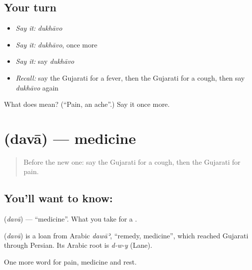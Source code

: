 \subsection*{Your turn}
\begin{itemize}
\raggedright
  \item \emph{Say it:} \emph{dukhāvo}
  \item \emph{Say it:} \emph{dukhāvo}, once more
  \item \emph{Say it:} say \emph{dukhāvo}
  \item \emph{Recall:} say the Gujarati for a fever, then the Gujarati for a cough, then say \emph{dukhāvo} again
\end{itemize}

\begin{tcolorbox}[breakable,colback=teal!4,colframe=teal!35!black,title={Before you move on}]
What does  mean? (\textquotedblleft{}Pain, an ache\textquotedblright{}.) Say it once more.
\end{tcolorbox}
\section[\texorpdfstring{\gu{દવા} (davā)}{દવા (davā)}]{ (davā) — medicine}

\label{lesson:GU-C49-medicine}



\begin{quote}
Before the new one: say the Gujarati for a cough, then the Gujarati for pain.
\end{quote}

\subsection*{You'll want to know: }
\textbf{} (\emph{davā}) — \textquotedblleft{}medicine\textquotedblright{}. What you take for a \textbf{}.

\begin{cousinweb}
\textbf{} (\emph{davā}) is a loan from Arabic \emph{dawāʾ}, \textquotedblleft{}remedy, medicine\textquotedblright{}, which reached Gujarati through Persian. Its Arabic root is \emph{d-w-y} (Lane).
\end{cousinweb}

\begin{grammarlens}[title={What you've built}]
One more word for pain, medicine and rest.
\end{grammarlens}

